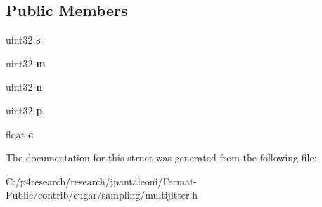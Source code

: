 \subsection*{Public Members}
\begin{DoxyCompactItemize}
\item 
\mbox{\label{structcugar_1_1_correlated_m_j_sampler_a4dcf70000d0913072a393416768bcce8}} 
uint32 {\bfseries s}
\item 
\mbox{\label{structcugar_1_1_correlated_m_j_sampler_afb48da6a05bff8d2ae6c0daff6269776}} 
uint32 {\bfseries m}
\item 
\mbox{\label{structcugar_1_1_correlated_m_j_sampler_ab8b5705c0e9fdc819598f84b37aad204}} 
uint32 {\bfseries n}
\item 
\mbox{\label{structcugar_1_1_correlated_m_j_sampler_a6595534f6ec8afd47fae7a7dd583dd85}} 
uint32 {\bfseries p}
\item 
\mbox{\label{structcugar_1_1_correlated_m_j_sampler_a1c97d0dccc5628ee3473b0c6e8310f83}} 
float {\bfseries c}
\end{DoxyCompactItemize}


The documentation for this struct was generated from the following file\+:\begin{DoxyCompactItemize}
\item 
C\+:/p4research/research/jpantaleoni/\+Fermat-\/\+Public/contrib/cugar/sampling/multijitter.\+h\end{DoxyCompactItemize}
